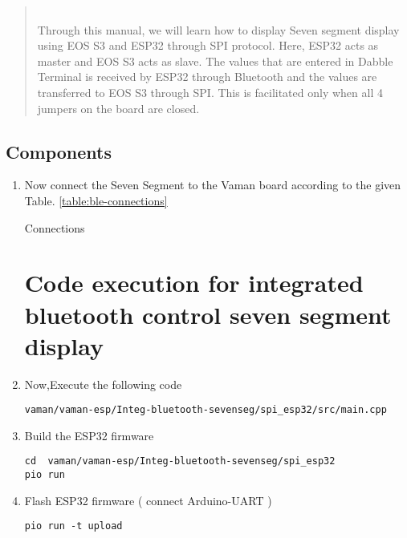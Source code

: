 \begin{abstract}\\
Through this manual, we will learn how to display Seven segment display using EOS S3 and ESP32 through SPI protocol. Here, ESP32 acts as master and EOS S3 acts as slave. The values that are entered in Dabble Terminal is received by ESP32 through Bluetooth and the values are transferred to EOS S3 through SPI. This is facilitated only when all 4 jumpers on the board are closed.
\end{abstract}
\subsection{Components}
\begin{enumerate}[label=\thesection.\arabic*.,ref=\thesection.\theenumi]

\begin{table}[!ht]
\centering

\caption{Components}
\label{table:ble-components}
\end{table}
\item Now connect the Seven Segment to the Vaman board according to the given Table. \ref{table:ble-connections}
\begin{table}[!ht]
\centering

\caption{Connections}
\label{table:ble-connections}
\end{table}

\section{Code execution for integrated bluetooth control seven segment display}
\raggedright
\item Now,Execute the following code
\begin{lstlisting}
vaman/vaman-esp/Integ-bluetooth-sevenseg/spi_esp32/src/main.cpp
\end{lstlisting}

\item Build the ESP32 firmware
\begin{lstlisting}
cd  vaman/vaman-esp/Integ-bluetooth-sevenseg/spi_esp32
pio run
\end{lstlisting} 

\item Flash ESP32 firmware ( connect Arduino-UART  )
\begin{lstlisting}
pio run -t upload
\end{lstlisting} 


\end{enumerate}
